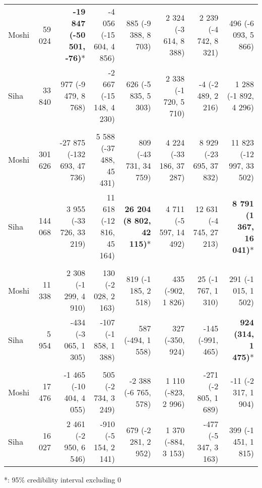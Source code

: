 \begin{table}[t]
\begin{tabular*}{\linewidth}{@{\extracolsep{\fill}}l|rrrrrrr}
\midrule\addlinespace[2.5pt]
\multicolumn{8}{l}{Diarrhea} \\[2.5pt] 
\midrule\addlinespace[2.5pt]
Moshi & 59 024 & \textbf{-19 847 (-50 501, -76)}* & -4 056 (-15 604, 4 856) & 885 (-9 388, 8 703) & 2 324 (-3 614, 8 388) & 2 239 (-4 742, 8 321) & 496 (-6 093, 5 866) \\ 
Siha & 33 840 & 977 (-9 479, 8 768) & -2 667 (-15 148, 4 230) & 626 (-5 835, 5 303) & 2 338 (-1 720, 5 710) & -4 (-2 489, 2 216) & 1 288 (-1 892, 4 296) \\ 
\midrule\addlinespace[2.5pt]
\multicolumn{8}{l}{Urinary Tract Infections} \\[2.5pt] 
\midrule\addlinespace[2.5pt]
Moshi & 301 626 & -27 875 (-132 693, 47 736) & 5 588 (-37 488, 45 431) & 809 (-43 731, 34 759) & 4 224 (-33 186, 37 287) & 8 929 (-23 695, 37 832) & 11 823 (-12 997, 33 502) \\ 
Siha & 144 068 & 3 955 (-33 726, 33 219) & 11 618 (-12 816, 45 164) & \textbf{26 204 (8 802, 42 115)}* & 4 711 (-5 597, 14 492) & 12 631 (-4 745, 27 213) & \textbf{8 791 (1 367, 16 041)}* \\ 
\midrule\addlinespace[2.5pt]
\multicolumn{8}{l}{Malaria} \\[2.5pt] 
\midrule\addlinespace[2.5pt]
Moshi & 11 338 & 2 308 (-1 299, 4 910) & 130 (-2 028, 2 163) & 819 (-1 185, 2 518) & 435 (-902, 1 826) & 25 (-1 767, 1 310) & 291 (-1 015, 1 502) \\ 
Siha & 5 954 & -434 (-3 065, 1 305) & -107 (-1 858, 1 388) & 587 (-494, 1 558) & 327 (-350, 924) & -145 (-991, 465) & \textbf{924 (314, 1 475)}* \\ 
\midrule\addlinespace[2.5pt]
\multicolumn{8}{l}{Infectious Eye Disease} \\[2.5pt] 
\midrule\addlinespace[2.5pt]
Moshi & 17 476 & -1 465 (-10 404, 4 055) & 505 (-2 734, 3 249) & -2 388 (-6 765, 578) & 1 110 (-823, 2 996) & -271 (-2 805, 1 689) & -11 (-2 317, 1 904) \\ 
Siha & 16 027 & 2 461 (-2 950, 6 546) & -910 (-5 154, 2 141) & 679 (-2 281, 2 952) & 1 370 (-884, 3 153) & -477 (-5 347, 3 163) & 399 (-1 451, 1 815) \\ 
\bottomrule
\end{tabular*}
\begin{minipage}{\linewidth}
*: 95\% credibility interval excluding 0\\
\end{minipage}
\end{table}

